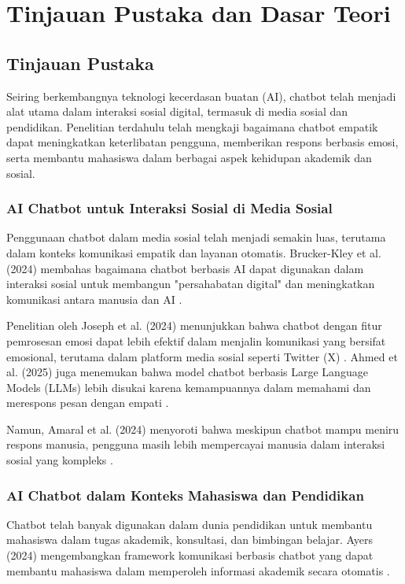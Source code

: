 \chapter{Tinjauan Pustaka dan Dasar Teori}

\section{Tinjauan Pustaka}

Seiring berkembangnya teknologi kecerdasan buatan (AI), chatbot telah menjadi alat utama dalam interaksi sosial digital, termasuk di media sosial dan pendidikan. Penelitian terdahulu telah mengkaji bagaimana chatbot empatik dapat meningkatkan keterlibatan pengguna, memberikan respons berbasis emosi, serta membantu mahasiswa dalam berbagai aspek kehidupan akademik dan sosial.

\subsection{AI Chatbot untuk Interaksi Sosial di Media Sosial}

Penggunaan chatbot dalam media sosial telah menjadi semakin luas, terutama dalam konteks komunikasi empatik dan layanan otomatis. Brucker-Kley et al. (2024) membahas bagaimana chatbot berbasis AI dapat digunakan dalam interaksi sosial untuk membangun "persahabatan digital" dan meningkatkan komunikasi antara manusia dan AI \cite{brucker2024friendship}.

Penelitian oleh Joseph et al. (2024) menunjukkan bahwa chatbot dengan fitur pemrosesan emosi dapat lebih efektif dalam menjalin komunikasi yang bersifat emosional, terutama dalam platform media sosial seperti Twitter (X) \cite{joseph2024psychological}. Ahmed et al. (2025) juga menemukan bahwa model chatbot berbasis Large Language Models (LLMs) lebih disukai karena kemampuannya dalam memahami dan merespons pesan dengan empati \cite{ahmed2025primer}.

Namun, Amaral et al. (2024) menyoroti bahwa meskipun chatbot mampu meniru respons manusia, pengguna masih lebih mempercayai manusia dalam interaksi sosial yang kompleks \cite{amaral2024evaluating}.

\subsection{AI Chatbot dalam Konteks Mahasiswa dan Pendidikan}

Chatbot telah banyak digunakan dalam dunia pendidikan untuk membantu mahasiswa dalam tugas akademik, konsultasi, dan bimbingan belajar. Ayers (2024) mengembangkan framework komunikasi berbasis chatbot yang dapat membantu mahasiswa dalam memperoleh informasi akademik secara otomatis \cite{ayers2024trust}.

